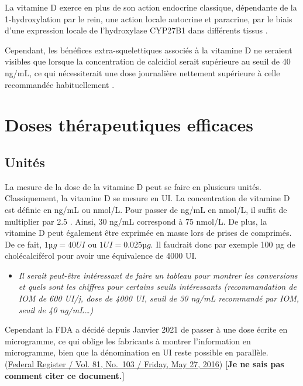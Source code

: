 \documentclass[
  a4paper,
  DIV=11,
  numbers=noendperiod,
  listof=totoc]{scrreprt}
\providecommand{\tightlist}{%
  \setlength{\itemsep}{0pt}\setlength{\parskip}{0pt}}\usepackage{longtable,booktabs,array}
\begin{document}
La vitamine D exerce en plus de son action endocrine classique,
dépendante de la 1-hydroxylation par le rein, une action locale
autocrine et paracrine, par le biais d'une expression locale de
l'hydroxylase \ac{CYP27B1} dans différents tissus
\autocite{Carmeliet.2015,Cannell.2008}.

Cependant, les bénéfices extra-squelettiques associés à la vitamine D ne
seraient visibles que lorsque la concentration de calcidiol serait
supérieure au seuil de 40 ng/mL, ce qui nécessiterait une dose
journalière nettement supérieure à celle recommandée habituellement
\autocite{Caprio.2017}.

\hypertarget{doses-thuxe9rapeutiques-efficaces}{%
\section{Doses thérapeutiques
efficaces}\label{doses-thuxe9rapeutiques-efficaces}}

\hypertarget{unituxe9s}{%
\subsection{Unités}\label{unituxe9s}}

La mesure de la dose de la vitamine D peut se faire en plusieurs unités.
Classiquement, la vitamine D se mesure en \ac{UI}. La concentration de
vitamine D est définie en ng/mL ou nmol/L. Pour passer de ng/mL en
nmol/L, il suffit de multiplier par 2.5 \autocite{Pramyothin.2012}.
Ainsi, 30 ng/mL correspond à 75 nmol/L. De plus, la vitamine D peut
également être exprimée en masse lors de prises de comprimés. De ce
fait, \(1 µg = 40 UI\) ou \(1 UI = 0.025 µg\). Il faudrait donc par
exemple 100 µg de cholécalciférol pour avoir une équivalence de 4000 UI.

\begin{itemize}
\tightlist
\item
  \emph{Il serait peut-être intéressant de faire un tableau pour montrer
  les conversions et quels sont les chiffres pour certains seuils
  intéressants (recommandation de IOM de 600 UI/j, dose de 4000 UI,
  seuil de 30 ng/mL recommandé par IOM, seuil de 40 ng/mL\ldots)}
\end{itemize}

Cependant la \ac{FDA} a décidé depuis Janvier 2021 de passer à une dose
écrite en microgramme, ce qui oblige les fabricants à montrer
l'information en microgramme, bien que la dénomination en UI reste
possible en parallèle.
(\href{https://www.govinfo.gov/content/pkg/FR-2016-05-27/pdf/2016-11867.pdf}{Federal
Register / Vol. 81, No.~103 / Friday, May 27, 2016}) \textbf{{[}Je ne
sais pas comment citer ce document.{]}}
\end{document}
